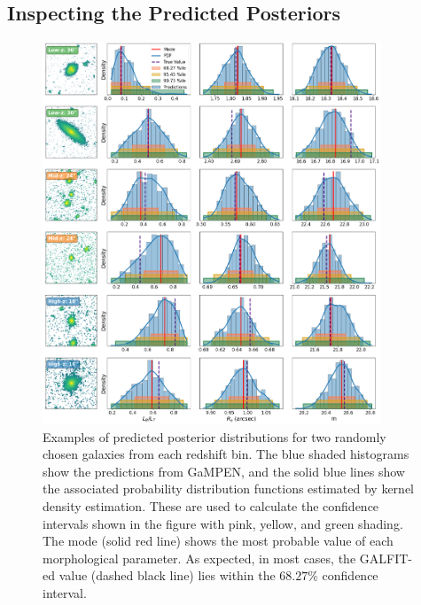 \documentclass[linenumbers,twocolumn,twocolappendix]{aastex631}
\newcommand\gampen{GaMPEN}
\begin{document}
\begin{CJK*}{UTF8}{gbsn}
\subsection{Inspecting the Predicted Posteriors}

\begin{figure}[htb]
    \centering
    \includegraphics[width = 0.9\textwidth]{example_pred_dists.png}
    \caption{Examples of predicted posterior distributions for two randomly chosen galaxies from each redshift bin. The blue shaded histograms show the predictions from \gampen{}, and the solid blue lines show the associated probability distribution functions estimated by kernel density estimation. These are used to calculate the confidence intervals shown in the figure with pink, yellow, and green shading. The mode (solid red line) shows the most probable value of each morphological parameter. As expected, in most cases, the GALFIT-ed value (dashed black line) lies within the $68.27\%$ confidence interval.}
    \label{fig:example_pred_dists}
\end{figure}



\end{CJK*}
\end{document}
